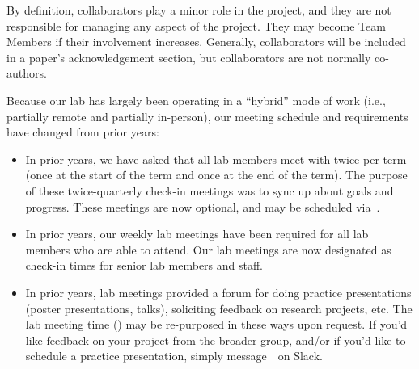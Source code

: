 \documentclass{tufte-book} %
\begin{document}
\begin{enumerate}
\begin{enumerate}
\end{enumerate}
By definition, collaborators play a minor role in the project, and they are not
responsible for managing any aspect of the project.  They may become Team
Members if their involvement increases.  Generally, collaborators will
be included in a paper's acknowledgement section, but collaborators
are not normally co-authors.
\end{enumerate}



\noindent Because our lab has largely been operating in a ``hybrid'' mode of work (i.e.,
partially remote and partially in-person), our meeting schedule and
requirements have changed from prior years:
\begin{itemize}

  \item In prior years, we have asked that all lab members meet with \director
  twice per term (once at the start of the term and once at the end of the
  term). The purpose of these twice-quarterly check-in meetings was to sync up
  about goals and progress. These meetings are now optional, and may be
  scheduled via~\meeting.

  \item In prior years, our weekly lab meetings have been required for all lab
  members who are able to attend. Our lab meetings are now designated as
  check-in times for senior lab members and staff.

\item In prior years, lab meetings provided a forum for doing practice
presentations (poster presentations, talks), soliciting feedback on research
projects, etc. The lab meeting time (\labmeetingtime) may be re-purposed in
these ways upon request. If you'd like feedback on your project from the
broader group, and/or if you'd like to schedule a practice presentation, simply
message~\director~on Slack. 

\end{itemize}
\end{document}
